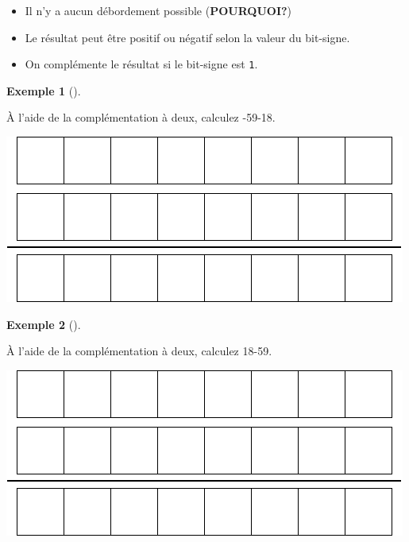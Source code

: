 \documentclass[
  letterpaper,
]{scrbook}
\providecommand{\tightlist}{%
  \setlength{\itemsep}{0pt}\setlength{\parskip}{0pt}}\usepackage{longtable,booktabs,array}
\theoremstyle{definition}
\newtheorem{example}{Exemple}[chapter]
\theoremstyle{definition}
\theoremstyle{plain}
\theoremstyle{remark}
\begin{document}
\begin{itemize}
\tightlist
\item
  Il n'y a aucun débordement possible (\textbf{POURQUOI?})
\item
  Le résultat peut être positif ou négatif selon la valeur du bit-signe.
\item
  On complémente le résultat si le bit-signe est \texttt{1}.
\end{itemize}

\leavevmode{}%
\begin{example}[]\label{exm-addition-complement-deux-5}

À l'aide de la complémentation à deux, calculez -59-18.

\includegraphics{./systeme_numeration_files/figure-pdf/unnamed-chunk-12-1.pdf}

\end{example}

\leavevmode{}%
\begin{example}[]\label{exm-addition-complement-deux-6}

À l'aide de la complémentation à deux, calculez 18-59.

\includegraphics{./systeme_numeration_files/figure-pdf/unnamed-chunk-13-1.pdf}

\end{example}
\end{document}
